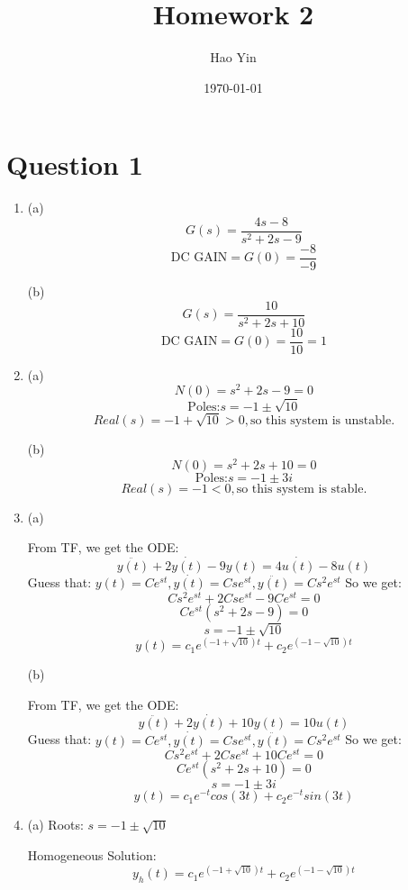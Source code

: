 \documentclass[12pt]{article}
\begin{document}
\title{Homework 2}
\author{Hao Yin}
\date{\today}
\maketitle

\section*{Question 1}
    \begin{enumerate}[label=\roman*.]
        \item (a)
        \[G(s) = \frac{4s-8}{s^2+2s-9}\]
        \[\text{DC GAIN} = G(0) = \frac{-8}{-9}\]

        (b)
        \[G(s) = \frac{10}{s^2+2s+10}\]
        \[\text{DC GAIN} = G(0) = \frac{10}{10} = 1\]

        \item (a)
        \[N(0) = s^2+2s-9 = 0\]
        \[\text{Poles:} s = -1 \pm \sqrt{10}\]
        \[Real(s) = -1 + \sqrt{10} > 0, \text{so this system is unstable.}\]

        (b)
        \[N(0) = s^2+2s+10 = 0\]
        \[\text{Poles:} s = -1 \pm 3i\]
        \[Real(s) = -1 < 0, \text{so this system is stable.}\]

        \item (a)
        
        From TF, we get the ODE:
        \[\ddot{y(t)} + 2\dot{y(t)} - 9y(t) = 4\dot{u(t)} - 8u(t)\]
        Guess that: $y(t) = Ce^{st}, \dot{y(t)} = Cse^{st}, 
            \ddot{y(t)} = Cs^2e^{st}$
        So we get:
        \[Cs^2e^{st} + 2Cse^{st} - 9Ce^{st} = 0\]
        \[Ce^{st} (s^2 + 2s - 9) = 0\]
        \[s = -1 \pm \sqrt{10}\]
        \[y(t) = c_1e^{(-1+\sqrt{10})t} + c_2e^{(-1-\sqrt{10})t}\]

        (b)

        From TF, we get the ODE:
        \[\ddot{y(t)} + 2\dot{y(t)} + 10y(t) = 10u(t)\]
        Guess that: $y(t) = Ce^{st}, \dot{y(t)} = Cse^{st}, 
            \ddot{y(t)} = Cs^2e^{st}$
        So we get:
        \[Cs^2e^{st} + 2Cse^{st} + 10Ce^{st} = 0\]
        \[Ce^{st} (s^2 + 2s + 10) = 0\]
        \[s = -1 \pm 3i\]
        \[y(t) = c_1e^{-t}cos(3t) + c_2e^{-t}sin(3t)\]

        \item (a)
        Roots: $s = -1 \pm \sqrt{10}$

        Homogeneous Solution: 
        \[y_h(t) = c_1e^{(-1+\sqrt{10})t} + c_2e^{(-1-\sqrt{10})t}\]


\end{enumerate}
\end{document}
